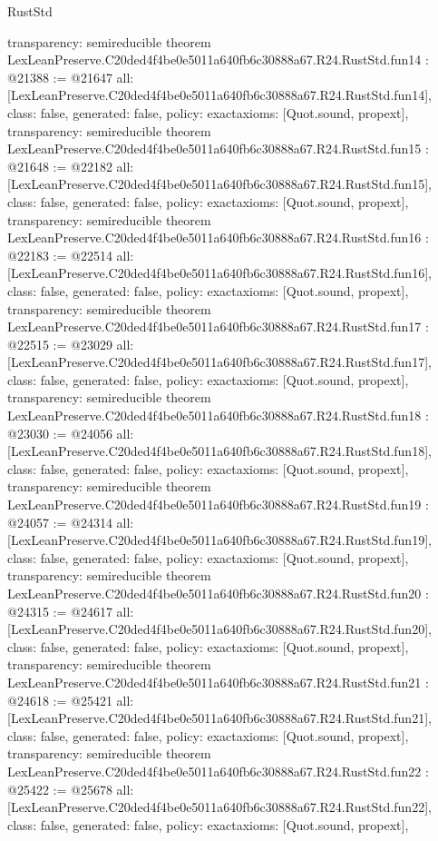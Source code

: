 \begin{lexlean}{RustStd}
\begin{coremodule}
{  transparency: semireducible
}
theorem LexLeanPreserve.C20ded4f4be0e5011a640fb6c30888a67.R24.RustStd.fun14 : @21388 := @21647 {
  all: [LexLeanPreserve.C20ded4f4be0e5011a640fb6c30888a67.R24.RustStd.fun14],
  class: false,
  generated: false,
  policy: exact{axioms: [Quot.sound, propext]},
  transparency: semireducible
}
theorem LexLeanPreserve.C20ded4f4be0e5011a640fb6c30888a67.R24.RustStd.fun15 : @21648 := @22182 {
  all: [LexLeanPreserve.C20ded4f4be0e5011a640fb6c30888a67.R24.RustStd.fun15],
  class: false,
  generated: false,
  policy: exact{axioms: [Quot.sound, propext]},
  transparency: semireducible
}
theorem LexLeanPreserve.C20ded4f4be0e5011a640fb6c30888a67.R24.RustStd.fun16 : @22183 := @22514 {
  all: [LexLeanPreserve.C20ded4f4be0e5011a640fb6c30888a67.R24.RustStd.fun16],
  class: false,
  generated: false,
  policy: exact{axioms: [Quot.sound, propext]},
  transparency: semireducible
}
theorem LexLeanPreserve.C20ded4f4be0e5011a640fb6c30888a67.R24.RustStd.fun17 : @22515 := @23029 {
  all: [LexLeanPreserve.C20ded4f4be0e5011a640fb6c30888a67.R24.RustStd.fun17],
  class: false,
  generated: false,
  policy: exact{axioms: [Quot.sound, propext]},
  transparency: semireducible
}
theorem LexLeanPreserve.C20ded4f4be0e5011a640fb6c30888a67.R24.RustStd.fun18 : @23030 := @24056 {
  all: [LexLeanPreserve.C20ded4f4be0e5011a640fb6c30888a67.R24.RustStd.fun18],
  class: false,
  generated: false,
  policy: exact{axioms: [Quot.sound, propext]},
  transparency: semireducible
}
theorem LexLeanPreserve.C20ded4f4be0e5011a640fb6c30888a67.R24.RustStd.fun19 : @24057 := @24314 {
  all: [LexLeanPreserve.C20ded4f4be0e5011a640fb6c30888a67.R24.RustStd.fun19],
  class: false,
  generated: false,
  policy: exact{axioms: [Quot.sound, propext]},
  transparency: semireducible
}
theorem LexLeanPreserve.C20ded4f4be0e5011a640fb6c30888a67.R24.RustStd.fun20 : @24315 := @24617 {
  all: [LexLeanPreserve.C20ded4f4be0e5011a640fb6c30888a67.R24.RustStd.fun20],
  class: false,
  generated: false,
  policy: exact{axioms: [Quot.sound, propext]},
  transparency: semireducible
}
theorem LexLeanPreserve.C20ded4f4be0e5011a640fb6c30888a67.R24.RustStd.fun21 : @24618 := @25421 {
  all: [LexLeanPreserve.C20ded4f4be0e5011a640fb6c30888a67.R24.RustStd.fun21],
  class: false,
  generated: false,
  policy: exact{axioms: [Quot.sound, propext]},
  transparency: semireducible
}
theorem LexLeanPreserve.C20ded4f4be0e5011a640fb6c30888a67.R24.RustStd.fun22 : @25422 := @25678 {
  all: [LexLeanPreserve.C20ded4f4be0e5011a640fb6c30888a67.R24.RustStd.fun22],
  class: false,
  generated: false,
  policy: exact{axioms: [Quot.sound, propext]},
}
\end{coremodule}
\end{lexlean}

